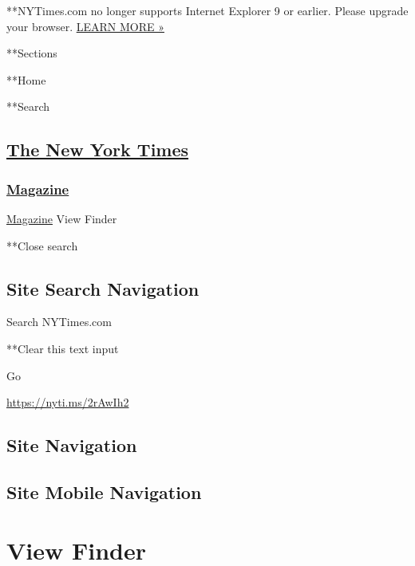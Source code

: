  **NYTimes.com no longer supports Internet Explorer 9 or earlier. Please
upgrade your browser.
\href{http://www.nytimes3xbfgragh.onion/content/help/site/ie9-support.html}{LEARN
MORE »}

**Sections

**Home

**Search

\hypertarget{the-new-york-times}{%
\subsection{\texorpdfstring{\href{http://www.nytimes3xbfgragh.onion/}{The
New York Times}}{The New York Times}}\label{the-new-york-times}}

\hypertarget{-magazine-}{%
\subsubsection{\texorpdfstring{
\href{https://www.nytimes3xbfgragh.onion/section/magazine}{Magazine}
}{ Magazine }}\label{-magazine-}}

 \href{https://www.nytimes3xbfgragh.onion/section/magazine}{Magazine}
\textbar{}View Finder

**Close search

\hypertarget{site-search-navigation}{%
\subsection{Site Search Navigation}\label{site-search-navigation}}

Search NYTimes.com

**Clear this text input

Go

\url{https://nyti.ms/2rAwIh2}

\hypertarget{site-navigation}{%
\subsection{Site Navigation}\label{site-navigation}}

\hypertarget{site-mobile-navigation}{%
\subsection{Site Mobile Navigation}\label{site-mobile-navigation}}

\hypertarget{view-finder}{%
\section{View Finder}\label{view-finder}}

